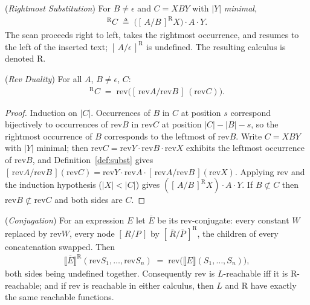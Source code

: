 \documentclass[runningheads,envcountsect]{llncs}
\begin{document}
\begin{definition}
    (\emph{Rightmost Substitution})
    \label{def:r2l}
    For $B \neq \epsilon$ and $C = XBY$ with $|Y|$ \emph{minimal},
    \begin{align}
        [\,A/B\,]^{\mathrm{R}} C \;\triangleq\; \big([\,A/B\,]^{\mathrm{R}} X\big)\cdot A\cdot Y .
    \end{align}
    The scan proceeds right to left, takes the rightmost occurrence, and resumes to the left of the inserted text; $[\,A/\epsilon\,]^{\mathrm{R}}$ is undefined. The resulting calculus is denoted $\mathrm{R}$.
\end{definition}

\begin{theorem}
    (\emph{Rev Duality})
    \label{thm:rev-duality}
    For all $A$, $B \neq \epsilon$, $C$:
    \begin{align}
        [\,A/B\,]^{\mathrm{R}} C \;=\; \mathrm{rev}\big([\,\mathrm{rev}A/\mathrm{rev}B\,]\,(\mathrm{rev}C)\big).
    \end{align}
\end{theorem}

\begin{proof}
    Induction on $|C|$. Occurrences of $B$ in $C$ at position $s$ correspond bijectively to occurrences of $\mathrm{rev}B$ in $\mathrm{rev}C$ at position $|C|-|B|-s$, so the rightmost occurrence of $B$ corresponds to the leftmost of $\mathrm{rev}B$. Write $C = XBY$ with $|Y|$ minimal; then $\mathrm{rev}C = \mathrm{rev}Y\cdot\mathrm{rev}B\cdot\mathrm{rev}X$ exhibits the leftmost occurrence of $\mathrm{rev}B$, and Definition~\ref{def:subst} gives $[\,\mathrm{rev}A/\mathrm{rev}B\,](\mathrm{rev}C) = \mathrm{rev}Y\cdot\mathrm{rev}A\cdot[\,\mathrm{rev}A/\mathrm{rev}B\,](\mathrm{rev}X)$. Applying $\mathrm{rev}$ and the induction hypothesis ($|X| < |C|$) gives $([\,A/B\,]^{\mathrm{R}}X)\cdot A\cdot Y$. If $B \not\subset C$ then $\mathrm{rev}B \not\subset \mathrm{rev}C$ and both sides are $C$.
\end{proof}

\begin{theorem}
    (\emph{Conjugation})
    \label{thm:conjugation}
    For an expression $E$ let $\overline{E}$ be its rev-conjugate: every constant $W$ replaced by $\mathrm{rev}W$, every node $[\,R/P\,]$ by $[\,\overline{R}/\overline{P}\,]^{\mathrm{R}}$, the children of every concatenation swapped. Then
    \begin{align}
        \llbracket \overline{E} \rrbracket^{\mathrm{R}}(\mathrm{rev}S_1, \dots, \mathrm{rev}S_n) \;=\; \mathrm{rev}\big(\llbracket E \rrbracket(S_1, \dots, S_n)\big),
    \end{align}
    both sides being undefined together. Consequently $\mathrm{rev}$ is $L$-reachable iff it is $\mathrm{R}$-reachable; and if $\mathrm{rev}$ is reachable in either calculus, then $L$ and $\mathrm{R}$ have exactly the same reachable functions.
\end{theorem}
\end{document}
